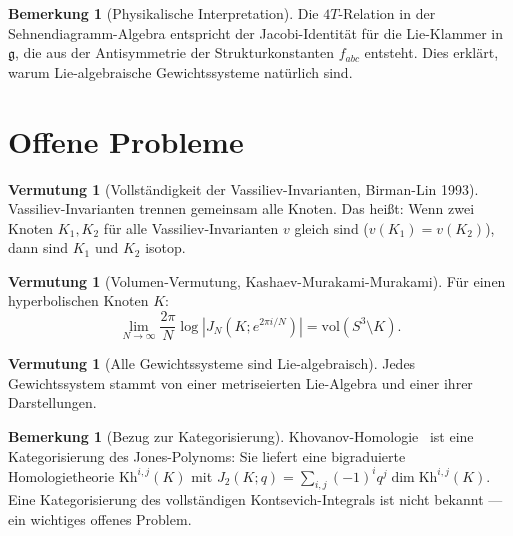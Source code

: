 \documentclass[12pt,a4paper]{amsart}
\theoremstyle{definition}
\newtheorem{vermutung}[theorem]{Vermutung}
\newtheorem{bemerkung}[theorem]{Bemerkung}
\begin{document}
\begin{bemerkung}[Physikalische Interpretation]
Die $4T$-Relation in der Sehnendiagramm-Algebra entspricht der Jacobi-Identität
für die Lie-Klammer in $\mathfrak{g}$, die aus der Antisymmetrie der
Strukturkonstanten $f_{abc}$ entsteht.  Dies erklärt, warum Lie-algebraische
Gewichtssysteme natürlich sind.
\end{bemerkung}

\section{Offene Probleme}\label{sec:offen}

\begin{vermutung}[Vollständigkeit der Vassiliev-Invarianten, Birman-Lin 1993]
\label{verm:vollstaendigkeit2}
Vassiliev-Invarianten trennen gemeinsam alle Knoten.  Das heißt: Wenn
zwei Knoten $K_1, K_2$ für alle Vassiliev-Invarianten $v$ gleich sind
($v(K_1) = v(K_2)$), dann sind $K_1$ und $K_2$ isotop.
\end{vermutung}

\begin{vermutung}[Volumen-Vermutung, Kashaev-Murakami-Murakami]
\label{verm:volumen}
Für einen hyperbolischen Knoten $K$:
\[
  \lim_{N \to \infty} \frac{2\pi}{N} \log |J_N(K; e^{2\pi i/N})| = \mathrm{vol}(S^3 \setminus K).
\]
\end{vermutung}

\begin{vermutung}[Alle Gewichtssysteme sind Lie-algebraisch]
\label{verm:lie_alg}
Jedes Gewichtssystem stammt von einer metriseierten Lie-Algebra und
einer ihrer Darstellungen.
\end{vermutung}

\begin{bemerkung}[Bezug zur Kategorisierung]
Khovanov-Homologie~\cite{khovanov2000} ist eine Kategorisierung des
Jones-Polynoms: Sie liefert eine bigraduierte Homologietheorie
$\mathrm{Kh}^{i,j}(K)$ mit $J_2(K;q) = \sum_{i,j} (-1)^i q^j \dim \mathrm{Kh}^{i,j}(K)$.
Eine Kategorisierung des vollständigen Kontsevich-Integrals ist nicht bekannt ---
ein wichtiges offenes Problem.
\end{bemerkung}
\end{document}
